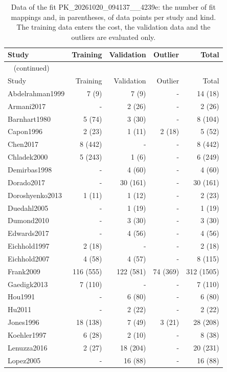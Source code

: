 \begin{longtable}{lrrrr}
\caption{Data of the fit PK\_20261020\_094137\_\_4239e: the number of fit mappings and, in parentheses, of data points per study and kind. The training data enters the cost, the validation data and the outliers are evaluated only.}\label{tab:data:PK_20261020_094137__4239e} \\
\toprule
Study & Training & Validation & Outlier & Total \\
\midrule
\endfirsthead
\multicolumn{5}{l}{\small\tablename~\thetable{} (continued)} \\
\toprule
Study & Training & Validation & Outlier & Total \\
\midrule
\endhead
\bottomrule
\endlastfoot
Abdelrahman1999 & 7 (9) & 7 (9) & - & 14 (18) \\
Armani2017 & - & 2 (26) & - & 2 (26) \\
Barnhart1980 & 5 (74) & 3 (30) & - & 8 (104) \\
Capon1996 & 2 (23) & 1 (11) & 2 (18) & 5 (52) \\
Chen2017 & 8 (442) & - & - & 8 (442) \\
Chladek2000 & 5 (243) & 1 (6) & - & 6 (249) \\
Demirbas1998 & - & 4 (60) & - & 4 (60) \\
Dorado2017 & - & 30 (161) & - & 30 (161) \\
Doroshyenko2013 & 1 (11) & 1 (12) & - & 2 (23) \\
Duedahl2005 & - & 1 (19) & - & 1 (19) \\
Dumond2010 & - & 3 (30) & - & 3 (30) \\
Edwards2017 & - & 4 (56) & - & 4 (56) \\
Eichhold1997 & 2 (18) & - & - & 2 (18) \\
Eichhold2007 & 4 (58) & 4 (57) & - & 8 (115) \\
Frank2009 & 116 (555) & 122 (581) & 74 (369) & 312 (1505) \\
Gaedigk2013 & 7 (110) & - & - & 7 (110) \\
Hou1991 & - & 6 (80) & - & 6 (80) \\
Hu2011 & - & 2 (22) & - & 2 (22) \\
Jones1996 & 18 (138) & 7 (49) & 3 (21) & 28 (208) \\
Koehler1997 & 6 (28) & 2 (10) & - & 8 (38) \\
Lenuzza2016 & 2 (27) & 18 (204) & - & 20 (231) \\
Lopez2005 & - & 16 (88) & - & 16 (88) \\

\end{longtable}
